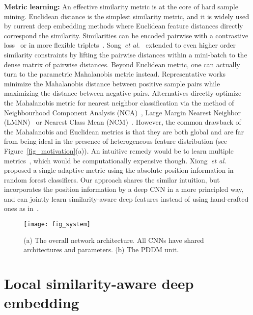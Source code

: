 \documentclass{article}
\newcommand{\etal}{\emph{et al.}}
\begin{document}
\textbf{Metric learning:} An effective similarity metric is at the core of hard sample mining. Euclidean distance is the simplest similarity metric, and it is widely used by current deep embedding methods where Euclidean feature distances directly correspond the similarity. Similarities can be encoded pairwise with a contrastive loss~\cite{bell15productnet} or in more flexible triplets~\cite{Schroff2015,Wang2014}. Song~\etal~\cite{songCVPR16} extended to even higher order similarity constraints by lifting the pairwise distances within a mini-batch to the dense matrix of pairwise distances. Beyond Euclidean metric, one can actually turn to the parametric Mahalanobis metric instead. Representative works~\cite{EricPXing2003,SCHHoi2006} minimize the Mahalanobis distance between positive sample pairs while maximizing the distance between negative pairs. Alternatives directly optimize the Mahalanobis metric for nearest neighbor classification via the method of Neighbourhood Component Analysis (NCA)~\cite{Goldberger2005}, Large Margin Nearest Neighbor (LMNN)~\cite{Weinberger2009} or Nearest Class Mean (NCM)~\cite{Mensink2013}. However, the common drawback of the Mahalanobis and Euclidean metrics is that they are both global and are far from being ideal in the presence of heterogeneous feature distribution (see Figure~\ref{fig_motivation}(a)). An intuitive remedy would be to learn multiple metrics~\cite{Frome2007}, which would be computationally expensive though. Xiong~\etal~\cite{XiJoXuKDD2012} proposed a single adaptive metric using the absolute position information in random forest classifiers.
Our approach shares the similar intuition, but incorporates the position information by a deep CNN in a more principled way, and can jointly learn similarity-aware deep features instead of using hand-crafted ones as in~\cite{XiJoXuKDD2012}.




\begin{figure}[t]
\begin{center}
\texttt{[image: fig\_system]}
\end{center}
\vskip -0.25cm
\caption{(a) The overall network architecture. All CNNs have shared architectures and parameters. (b) The PDDM unit.}
\label{fig_system}
\vspace{-1em}
\end{figure}

\section{Local similarity-aware deep embedding}
\end{document}
